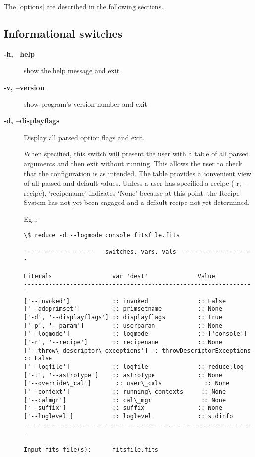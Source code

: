 \documentclass[letterpaper,10pt,english]{sphinxmanual}
\begin{document}
The {[}options{]} are described in the following sections.


\subsection{Informational switches}
\label{interfaces:informational-switches}\begin{description}
\item[{\textbf{-h, --help}}] \leavevmode
show the help message and exit

\item[{\textbf{-v, --version}}] \leavevmode
show program's version number and exit

\item[{\textbf{-d, --displayflags}}] \leavevmode
Display all parsed option flags and exit.

When specified, this switch will present the user with a table of all
parsed arguments and then exit without running. This allows the user to
check that the configuration is as intended. The table provides a convenient
view of all passed and default values. Unless a user has specified a
recipe (-r, --recipe), `recipename' indicates `None' because at this point,
the Recipe System has not yet been engaged and a default recipe not yet
determined.

Eg.,:

\begin{Verbatim}[commandchars=\\\{\}]
\$ reduce -d --logmode console fitsfile.fits

--------------------   switches, vars, vals  --------------------

Literals                 var 'dest'              Value
-----------------------------------------------------------------
['--invoked']            :: invoked              :: False
['--addprimset']         :: primsetname          :: None
['-d', '--displayflags'] :: displayflags         :: True
['-p', '--param']        :: userparam            :: None
['--logmode']            :: logmode              :: ['console']
['-r', '--recipe']       :: recipename           :: None
['--throw\_descriptor\_exceptions'] :: throwDescriptorExceptions :: False
['--logfile']            :: logfile              :: reduce.log
['-t', '--astrotype']    :: astrotype            :: None
['--override\_cal']       :: user\_cals            :: None
['--context']            :: running\_contexts     :: None
['--calmgr']             :: cal\_mgr              :: None
['--suffix']             :: suffix               :: None
['--loglevel']           :: loglevel             :: stdinfo
-----------------------------------------------------------------

Input fits file(s):      fitsfile.fits
\end{Verbatim}

\end{description}
\end{document}
